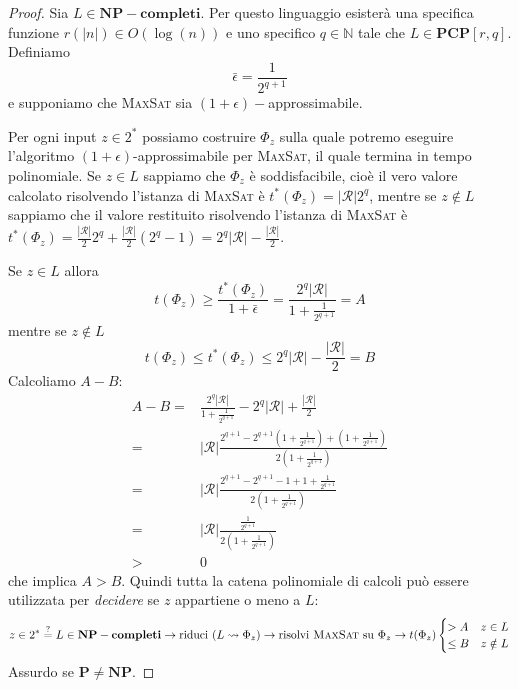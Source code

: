 \begin{proof}
	Sia $L \in \mathbf{NP-completi}$. Per questo linguaggio esisterà una specifica
	funzione $r(|n|) \in O (\log(n))$ e uno specifico $q \in \mathbb{N}$ tale
	che $L \in \mathbf{PCP}[r,q]$. Definiamo
	$$
		\bar{\epsilon} = \frac{1}{2^{q+1}}
	$$
	e supponiamo che \textsc{MaxSat} sia $(1 + \epsilon)-$approssimabile.

	Per ogni input $z \in 2^*$ possiamo costruire $\Phi_z$ sulla quale potremo
	eseguire l'algoritmo $(1+\epsilon)$-approssimabile per \textsc{MaxSat}, il quale
	termina in tempo polinomiale. Se $z \in L$ sappiamo che $\Phi_z$ è soddisfacibile,
	cioè il vero valore calcolato risolvendo l'istanza di \textsc{MaxSat} è
	$t^*(\Phi_z) = |\mathcal{R}|2^q$, mentre se $z \notin L$ sappiamo che il valore restituito risolvendo
	l'istanza di \textsc{MaxSat} è $t^*(\Phi_z) = \frac{|\mathcal{R}|}{2}2^q + \frac{|\mathcal{R}|}{2}(2^{q} -1) = 2^q |\mathcal{R}| - \frac{|\mathcal{R}|}{2}$.

	Se $z \in L$  allora
	$$
		t(\Phi_z) \geq \frac{t^*(\Phi_z)}{1 + \bar{\epsilon}} = \frac{2^q |\mathcal{R}|}{1 + \frac{1}{2^{q+1}}} = A
	$$
	mentre se $z \notin L$
	$$
		t(\Phi_z) \leq t^*(\Phi_z) \leq 2^q|\mathcal{R}| - \frac{|\mathcal{R}|}{2}  = B
	$$
	Calcoliamo $A- B$:
	\begin{align*}
		A - B = & \frac{2^q|\mathcal{R}|}{1 + \frac{1}{2^{q+1}}} - 2^q |\mathcal{R}| + \frac{|\mathcal{R}|}{2}                            \\
		=       & |\mathcal{R}| \frac{2^{q +1} - 2^{q + 1}(1 + \frac{1}{2^{q+1}}) + (1 + \frac{1}{2 ^{q + 1}})}{2(1 + \frac{1}{2^{q+1}})} \\
		=       & |\mathcal{R}| \frac{2^{q +1} - 2^{q + 1} -1 + 1 + \frac{1}{2^{q+1}}}{2(1 + \frac{1}{2^{q+1}})}                          \\
		=       & |\mathcal{R}| \frac{\frac{1}{2^{q+1}}}{2(1 + \frac{1}{2^{q+1}})}                                                        \\
		>       & 0
	\end{align*}
	che implica $A > B$.
	Quindi tutta la catena polinomiale di calcoli può essere utilizzata per
	\textit{decidere} se $z$ appartiene o meno a $L$:
	$$
		z \in 2^* \overset{?}{=} L \in \mathbf{NP-completi}  \rightarrow  \text{riduci } (L \leadsto \Phi_z) \rightarrow \text{risolvi \textsc{MaxSat} su } \Phi_z \rightarrow t(\Phi_z)
		\begin{cases}
			> A    & z \in L    \\
			\leq B & z \notin L \\
		\end{cases}
	$$
	Assurdo se $\mathbf{P} \neq \mathbf{NP}$.
\end{proof}

